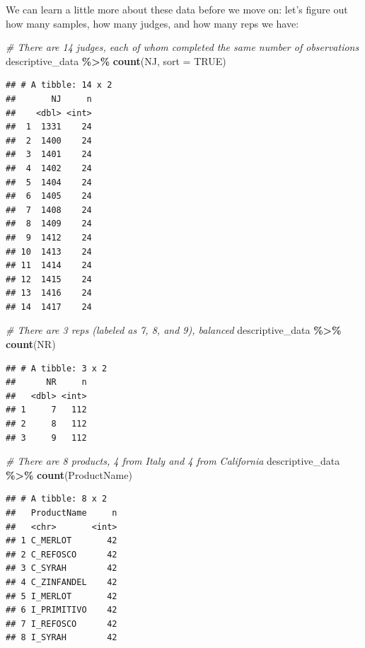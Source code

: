 \documentclass[
]{book}
\newenvironment{Shaded}{\begin{snugshade}}{\end{snugshade}}
\newcommand{\AttributeTok}[1]{\textcolor[rgb]{0.13,0.29,0.53}{#1}}
\newcommand{\CommentTok}[1]{\textcolor[rgb]{0.56,0.35,0.01}{\textit{#1}}}
\newcommand{\ConstantTok}[1]{\textcolor[rgb]{0.56,0.35,0.01}{#1}}
\newcommand{\FunctionTok}[1]{\textcolor[rgb]{0.13,0.29,0.53}{\textbf{#1}}}
\newcommand{\NormalTok}[1]{#1}
\newcommand{\SpecialCharTok}[1]{\textcolor[rgb]{0.81,0.36,0.00}{\textbf{#1}}}
\begin{document}
We can learn a little more about these data before we move on: let's figure out how many samples, how many judges, and how many reps we have:

\begin{Shaded}
\begin{Highlighting}[]
\CommentTok{\# There are 14 judges, each of whom completed the same number of observations}
\NormalTok{descriptive\_data }\SpecialCharTok{\%\textgreater{}\%}
  \FunctionTok{count}\NormalTok{(NJ, }\AttributeTok{sort =} \ConstantTok{TRUE}\NormalTok{)}
\end{Highlighting}
\end{Shaded}

\begin{verbatim}
## # A tibble: 14 x 2
##       NJ     n
##    <dbl> <int>
##  1  1331    24
##  2  1400    24
##  3  1401    24
##  4  1402    24
##  5  1404    24
##  6  1405    24
##  7  1408    24
##  8  1409    24
##  9  1412    24
## 10  1413    24
## 11  1414    24
## 12  1415    24
## 13  1416    24
## 14  1417    24
\end{verbatim}

\begin{Shaded}
\begin{Highlighting}[]
\CommentTok{\# There are 3 reps (labeled as 7, 8, and 9), balanced}
\NormalTok{descriptive\_data }\SpecialCharTok{\%\textgreater{}\%}
  \FunctionTok{count}\NormalTok{(NR)}
\end{Highlighting}
\end{Shaded}

\begin{verbatim}
## # A tibble: 3 x 2
##      NR     n
##   <dbl> <int>
## 1     7   112
## 2     8   112
## 3     9   112
\end{verbatim}

\begin{Shaded}
\begin{Highlighting}[]
\CommentTok{\# There are 8 products, 4 from Italy and 4 from California}
\NormalTok{descriptive\_data }\SpecialCharTok{\%\textgreater{}\%}
  \FunctionTok{count}\NormalTok{(ProductName)}
\end{Highlighting}
\end{Shaded}

\begin{verbatim}
## # A tibble: 8 x 2
##   ProductName     n
##   <chr>       <int>
## 1 C_MERLOT       42
## 2 C_REFOSCO      42
## 3 C_SYRAH        42
## 4 C_ZINFANDEL    42
## 5 I_MERLOT       42
## 6 I_PRIMITIVO    42
## 7 I_REFOSCO      42
## 8 I_SYRAH        42
\end{verbatim}
\end{document}
